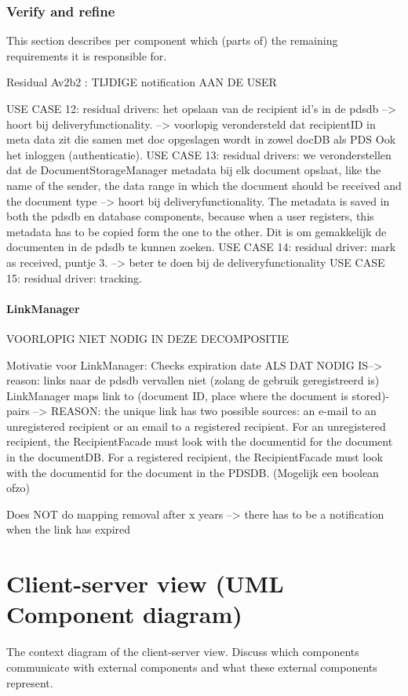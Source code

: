 \documentclass[a4paper,10pt]{article}
\begin{document}
\subsubsection{Verify and refine}
This section describes per component which (parts of) the remaining
requirements it is responsible for.

Residual Av2b2 : TIJDIGE notification AAN DE USER

USE CASE 12: residual drivers: het opslaan van de recipient id's in de pdsdb --> hoort bij deliveryfunctionality. --> voorlopig verondersteld dat recipientID in meta data zit die samen met doc opgeslagen wordt in zowel docDB als PDS
Ook het inloggen (authenticatie).
USE CASE 13:  residual drivers: we veronderstellen dat de DocumentStorageManager metadata bij elk document opslaat, like the name of the sender, the data range in which the document should be received and the document type --> hoort bij deliveryfunctionality.
The metadata is saved in both the pdsdb en database components, because when a user registers, this metadata has to be copied form the one to the other. Dit is om gemakkelijk de documenten in de pdsdb te kunnen zoeken.
USE CASE 14:  residual driver: mark as received, puntje 3. --> beter te doen bij de deliveryfunctionality
USE CASE 15:  residual driver: tracking.

\paragraph{LinkManager} VOORLOPIG NIET NODIG IN DEZE DECOMPOSITIE

Motivatie voor LinkManager: Checks expiration date ALS DAT NODIG IS--> reason: links naar de pdsdb vervallen niet (zolang de gebruik geregistreerd is)
LinkManager maps link to (document ID, place where the document is stored)-pairs --> REASON: the unique link has two possible sources: an e-mail to an unregistered recipient or an email to a registered recipient. For an unregistered recipient, the RecipientFacade must look with the documentid for the document in the documentDB. For a registered recipient, the RecipientFacade must look with the documentid for the document  in the PDSDB. (Mogelijk een boolean ofzo)

Does NOT do mapping removal after x years --> there has to be a notification when the link has expired

\section{Client-server view (UML Component diagram)}\label{sec:client-server}
The context diagram of the client-server view.
Discuss which components communicate with external components and what these
external components represent.
\end{document}

